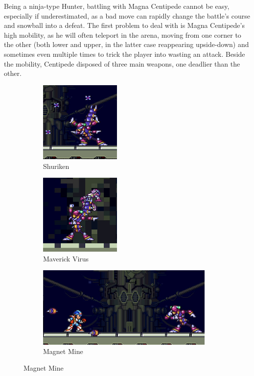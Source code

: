 Being a ninja-type Hunter, battling with Magna Centipede cannot be easy, especially if underestimated, as a bad move can rapidly change the battle's course and snowball into a defeat. The first problem to deal with is Magna Centipede's high mobility, as he will often teleport in the arena, moving from one corner to the other (both lower and upper, in the latter case reappearing upside-down) and sometimes even multiple times to trick the player into wasting an attack. Beside the mobility, Centipede disposed of three main weapons, one deadlier than the other.
\begin{figure}[htp]
	\centering
	\begin{subfigure}{0.4\linewidth}
		\centering
		\includegraphics[height=4cm]{figures/X2/Magna_centipede/Centipede_shuriken.png}
		\caption{Shuriken}
	\end{subfigure}
	\begin{subfigure}{0.4\linewidth}
		\centering
		\includegraphics[height=4cm]{figures/X2/Magna_centipede/Centipede_injection.png}
		\caption{Maverick Virus}
	\end{subfigure}
	\begin{subfigure}{\linewidth}
		\centering
		\includegraphics[height= 4cm]{figures/X2/Magna_centipede/Centipede_magnet.png}
		\caption{Magnet Mine}
	\end{subfigure}

\end{figure}
